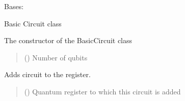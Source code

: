 \documentclass[letterpaper,10pt,english]{sphinxmanual}
\begin{document}
\begin{fulllineitems}
\label{\detokenize{qcompute_qapp.circuit:qcompute_qapp.circuit.BasicCircuit}}
\pysigstartsignatures
{}
\pysigstopsignatures
\sphinxAtStartPar
Bases: 

\sphinxAtStartPar
Basic Circuit class

\sphinxAtStartPar
The constructor of the BasicCircuit class
\begin{quote}\begin{description}
\sphinxAtStartPar
{} () \textendash{} Number of qubits

\end{description}\end{quote}

\begin{fulllineitems}
\label{\detokenize{qcompute_qapp.circuit:qcompute_qapp.circuit.BasicCircuit.add_circuit}}
\pysigstartsignatures
{}
\pysigstopsignatures
\sphinxAtStartPar
Adds circuit to the register.
\begin{quote}\begin{description}
\sphinxAtStartPar
{} () \textendash{} Quantum register to which this circuit is added

\end{description}\end{quote}

\end{fulllineitems}


\end{fulllineitems}

\end{document}
